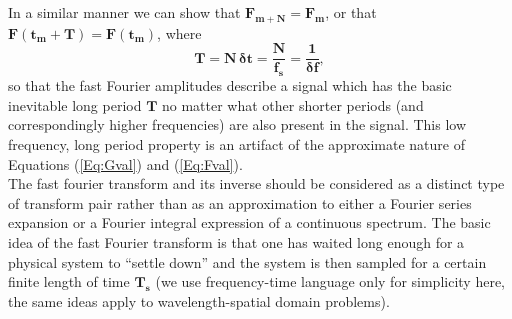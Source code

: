 \documentclass[11pt]{article}
\begin{document}
\noindent In a similar manner we can show that $\mathbf{F_{m + N} = F_{m}}$,
or that $\mathbf{F(t_{m} + T) = F(t_{m})}$, where
\begin{equation}
  \mathbf{T = N\,\boldsymbol{\delta}t = \frac{N}{f_{s}} = \frac{1}{\boldsymbol{\delta}f}},
\end{equation}
  so that the fast Fourier amplitudes
  describe a signal which has the basic inevitable long period $\mathbf{T}$ no matter
  what other shorter periods (and correspondingly higher frequencies) are also
  present in the signal.
This low frequency, long period property is an artifact of the approximate nature
  of Equations (\ref{Eq:Gval}) and (\ref{Eq:Fval}).\\
  
\noindent The fast fourier transform and its inverse should be considered as a distinct
  type of transform pair rather than as an approximation to either a Fourier
  series expansion or a Fourier integral expression of a continuous spectrum.
The basic idea of the fast Fourier transform is that one has waited long enough
  for a physical system to ``settle down'' and the system is then sampled for
  a certain finite length of time $\mathbf{T_{s}}$ (we use frequency-time language 
  only for simplicity here, the same ideas apply to wavelength-spatial domain
  problems).
\newpage
\end{document}
